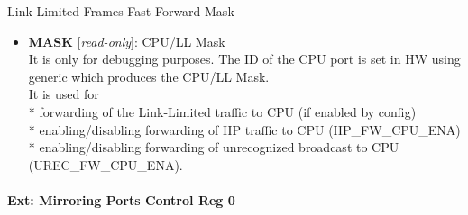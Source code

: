 \vspace{12pt}
Link-Limited Frames Fast Forward Mask

\vspace{12pt}
\noindent
{}

\begin{itemize}
\item \begin{small}
{\bf 
MASK
} [\emph{read-only}]:  CPU/LL Mask
\\
 It is only for debugging purposes. The ID of the CPU port is set in HW using generic which produces the CPU/LL Mask.\\             It is used for\\             * forwarding of the Link-Limited traffic to CPU (if enabled by config) \\             * enabling/disabling forwarding of HP traffic to CPU (HP\_FW\_CPU\_ENA)\\             * enabling/disabling forwarding of unrecognized broadcast to CPU (UREC\_FW\_CPU\_ENA).
\end{small}
\end{itemize}
\paragraph*{Ext: Mirroring Ports Control Reg 0}\vspace{12pt}

